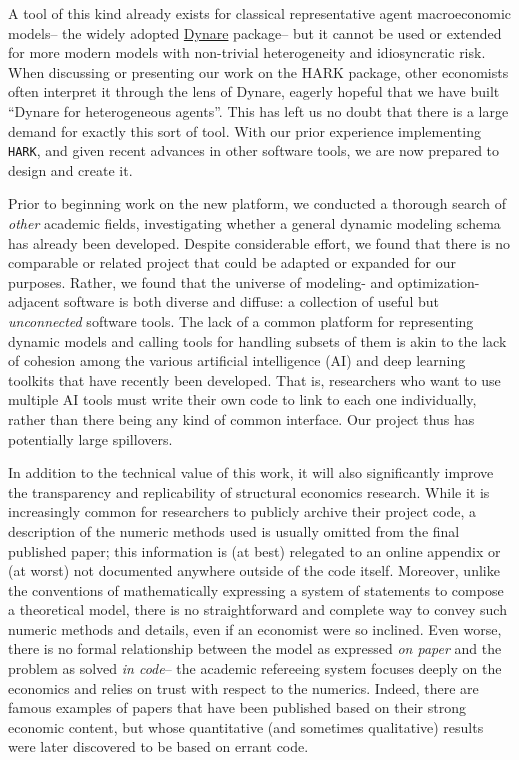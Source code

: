 \documentclass[11pt,pdftex,letterpaper]{article}
\begin{document}
A tool of this kind already exists for classical representative agent macroeconomic models-- the widely adopted \href{https://www.dynare.org/}{Dynare} package-- but it cannot be used or extended for more modern models with non-trivial heterogeneity and idiosyncratic risk. When discussing or presenting our work on the HARK package, other economists often interpret it through the lens of Dynare, eagerly hopeful that we have built ``Dynare for heterogeneous agents''. This has left us no doubt that there is a large demand for exactly this sort of tool. With our prior experience implementing \texttt{HARK}, and given recent advances in other software tools, we are now prepared to design and create it.

Prior to beginning work on the new platform, we conducted a thorough search of \textit{other} academic fields, investigating whether a general dynamic modeling schema has already been developed. Despite considerable effort, we found that there is no comparable or related project that could be adapted or expanded for our purposes. Rather, we found that the universe of modeling- and optimization-adjacent software is both diverse and diffuse: a collection of useful but \textit{unconnected} software tools. The lack of a common platform for representing dynamic models and calling tools for handling subsets of them is akin to the lack of cohesion among the various artificial intelligence (AI) and deep learning toolkits that have recently been developed. That is, researchers who want to use multiple AI tools must write their own code to link to each one individually, rather than there being any kind of common interface. Our project thus has potentially large spillovers.

In addition to the technical value of this work, it will also significantly improve the transparency and replicability of structural economics research. While it is increasingly common for researchers to publicly archive their project code, a description of the numeric methods used is usually omitted from the final published paper; this information is (at best) relegated to an online appendix or (at worst) not documented anywhere outside of the code itself. Moreover, unlike the conventions of mathematically expressing a system of statements to compose a theoretical model, there is no straightforward and complete way to convey such numeric methods and details, even if an economist were so inclined. Even worse, there is no formal relationship between the model as expressed \textit{on paper} and the problem as solved \textit{in code}-- the academic refereeing system focuses deeply on the economics and relies on trust with respect to the numerics. Indeed, there are famous examples of papers that have been published based on their strong economic content, but whose quantitative (and sometimes qualitative) results were later discovered to be based on errant code.
\end{document}
